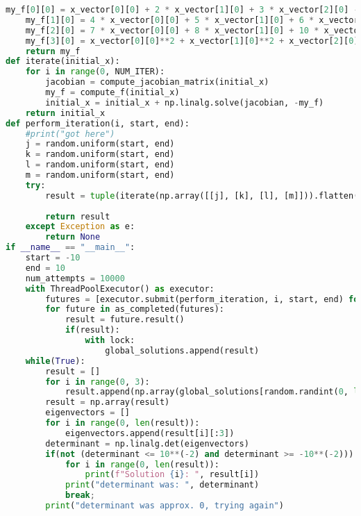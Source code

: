 \documentclass{article}
\begin{document}
\begin{enumerate}[label=\alph*.)]
\begin{lstlisting}[language=Python]
    my_f[0][0] = x_vector[0][0] + 2 * x_vector[1][0] + 3 * x_vector[2][0] - x_vector[3][0] * x_vector[0][0]
    my_f[1][0] = 4 * x_vector[0][0] + 5 * x_vector[1][0] + 6 * x_vector[2][0] - x_vector[3][0] * x_vector[1][0]
    my_f[2][0] = 7 * x_vector[0][0] + 8 * x_vector[1][0] + 10 * x_vector[2][0] - x_vector[3][0] * x_vector[2][0]
    my_f[3][0] = x_vector[0][0]**2 + x_vector[1][0]**2 + x_vector[2][0]**2 - 1
    return my_f
def iterate(initial_x):
    for i in range(0, NUM_ITER):
        jacobian = compute_jacobian_matrix(initial_x)
        my_f = compute_f(initial_x)
        initial_x = initial_x + np.linalg.solve(jacobian, -my_f)
    return initial_x
def perform_iteration(i, start, end):
    #print("got here")
    j = random.uniform(start, end)
    k = random.uniform(start, end)
    l = random.uniform(start, end)
    m = random.uniform(start, end)
    try:
        result = tuple(iterate(np.array([[j], [k], [l], [m]])).flatten())
        
        return result
    except Exception as e:
        return None
if __name__ == "__main__":
    start = -10
    end = 10
    num_attempts = 10000
    with ThreadPoolExecutor() as executor:
        futures = [executor.submit(perform_iteration, i, start, end) for i in range(num_attempts)]
        for future in as_completed(futures):
            result = future.result()
            if(result):
                with lock:
                    global_solutions.append(result)
    while(True):
        result = []
        for i in range(0, 3):
            result.append(np.array(global_solutions[random.randint(0, len(global_solutions))]))
        result = np.array(result)
        eigenvectors = []
        for i in range(0, len(result)):
            eigenvectors.append(result[i][:3])
        determinant = np.linalg.det(eigenvectors)
        if(not (determinant <= 10**(-2) and determinant >= -10**(-2))):
            for i in range(0, len(result)):
                print(f"Solution {i}: ", result[i]) 
            print("determinant was: ", determinant)
            break;
        print("determinant was approx. 0, trying again")
\end{lstlisting} 
\end{enumerate} 
\end{document}
